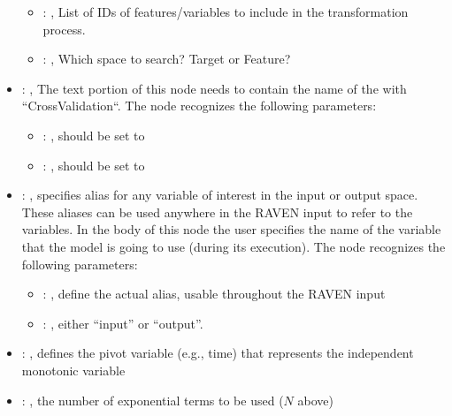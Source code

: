 \begin{itemize}
\begin{itemize}
        \item {}: , 
          List of IDs of features/variables to include in the transformation process.

        \item {}: , 
          Which space to search? Target or Feature?
      \end{itemize}

    \item {}: , 
      The text portion of this node needs to contain the name of the  with
               ``CrossValidation``.
      The  node recognizes the following parameters:
        \begin{itemize}
          \item {}: , 
            should be set to 
          \item {}: , 
            should be set to 
      \end{itemize}

    \item {}: , 
      specifies alias for         any variable of interest in the input or output space. These
      aliases can be used anywhere in the RAVEN input to         refer to the variables. In the body
      of this node the user specifies the name of the variable that the model is going to use
      (during its execution).
      The  node recognizes the following parameters:
        \begin{itemize}
          \item {}: , 
            define the actual alias, usable throughout the RAVEN input
          \item {}: , 
            either ``input'' or ``output''.
      \end{itemize}

    \item {}: , 
      defines the pivot variable (e.g., time) that represents the
      independent monotonic variable

    \item {}: , 
      the number of exponential terms to be used ($N$ above)


\end{itemize}
